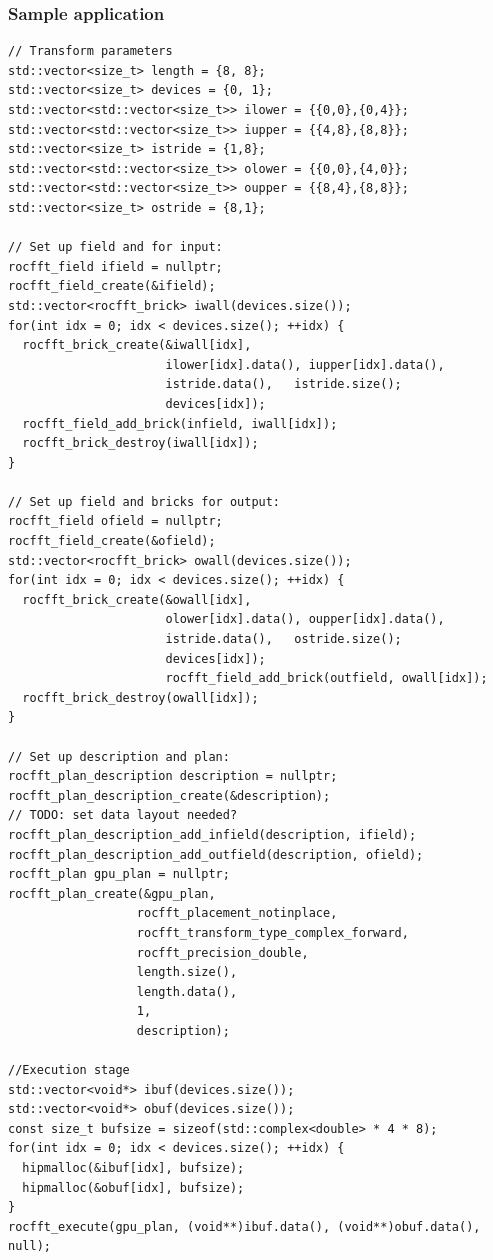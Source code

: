 \documentclass[12pt]{article}
\renewcommand{\(}{\left(}
\renewcommand{\)}{\right)}
\begin{document}
\subsubsection{Sample application}
\begin{lstlisting}
// Transform parameters
std::vector<size_t> length = {8, 8};
std::vector<size_t> devices = {0, 1};
std::vector<std::vector<size_t>> ilower = {{0,0},{0,4}};
std::vector<std::vector<size_t>> iupper = {{4,8},{8,8}};
std::vector<size_t> istride = {1,8};
std::vector<std::vector<size_t>> olower = {{0,0},{4,0}};
std::vector<std::vector<size_t>> oupper = {{8,4},{8,8}};
std::vector<size_t> ostride = {8,1};

// Set up field and for input:
rocfft_field ifield = nullptr;
rocfft_field_create(&ifield);
std::vector<rocfft_brick> iwall(devices.size());
for(int idx = 0; idx < devices.size(); ++idx) {
  rocfft_brick_create(&iwall[idx],
                      ilower[idx].data(), iupper[idx].data(),
                      istride.data(),   istride.size();
                      devices[idx]);
  rocfft_field_add_brick(infield, iwall[idx]);
  rocfft_brick_destroy(iwall[idx]);
}

// Set up field and bricks for output:
rocfft_field ofield = nullptr;
rocfft_field_create(&ofield);
std::vector<rocfft_brick> owall(devices.size());
for(int idx = 0; idx < devices.size(); ++idx) {
  rocfft_brick_create(&owall[idx],
                      olower[idx].data(), oupper[idx].data(),
                      istride.data(),   ostride.size();
                      devices[idx]);
                      rocfft_field_add_brick(outfield, owall[idx]);
  rocfft_brick_destroy(owall[idx]);
}

// Set up description and plan:
rocfft_plan_description description = nullptr;
rocfft_plan_description_create(&description);
// TODO: set data layout needed?
rocfft_plan_description_add_infield(description, ifield);
rocfft_plan_description_add_outfield(description, ofield);
rocfft_plan gpu_plan = nullptr;
rocfft_plan_create(&gpu_plan,
                  rocfft_placement_notinplace,
                  rocfft_transform_type_complex_forward,
                  rocfft_precision_double,
                  length.size(),
                  length.data(),
                  1,
                  description);

//Execution stage
std::vector<void*> ibuf(devices.size());
std::vector<void*> obuf(devices.size());
const size_t bufsize = sizeof(std::complex<double> * 4 * 8);
for(int idx = 0; idx < devices.size(); ++idx) {
  hipmalloc(&ibuf[idx], bufsize);
  hipmalloc(&obuf[idx], bufsize);
}
rocfft_execute(gpu_plan, (void**)ibuf.data(), (void**)obuf.data(), null);
\end{lstlisting}
\end{document}
